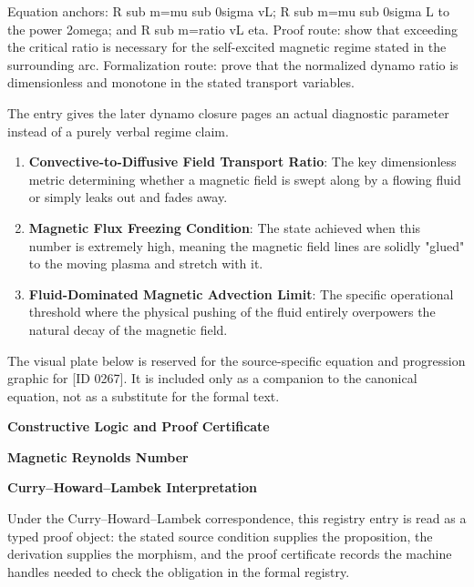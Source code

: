 Equation anchors: R sub m=mu sub 0sigma vL; R sub m=mu sub 0sigma L to the power 2omega; and R sub m=ratio vL eta. Proof route: show that exceeding the critical ratio is necessary for the self-excited magnetic regime stated in the surrounding arc. Formalization route: prove that the normalized dynamo ratio is dimensionless and monotone in the stated transport variables.

The entry gives the later dynamo closure pages an actual diagnostic parameter instead of a purely verbal regime claim.
\endgroup

\begin{enumerate}[leftmargin=1.6em,itemsep=6pt,topsep=4pt]
\item \textbf{Convective-to-Diffusive Field Transport Ratio}: The key dimensionless metric determining whether a magnetic field is swept along by a flowing fluid or simply leaks out and fades away.
\item \textbf{Magnetic Flux Freezing Condition}: The state achieved when this number is extremely high, meaning the magnetic field lines are solidly "glued" to the moving plasma and stretch with it.
\item \textbf{Fluid-Dominated Magnetic Advection Limit}: The specific operational threshold where the physical pushing of the fluid entirely overpowers the natural decay of the magnetic field.
\end{enumerate}

\begingroup\footnotesize\sloppy
The visual plate below is reserved for the source-specific equation and progression graphic for [ID 0267]. It is included only as a companion to the canonical equation, not as a substitute for the formal text.
\par\endgroup
\ifTZPDarkEdition
{}
\fi

\clearpage
\begingroup\tzpsupportsetup
\noindent\textbf{\fontsize{10.8pt}{12.8pt}\selectfont [ID 0267] Constructive Logic and Proof Certificate}\par
\noindent\textbf{\fontsize{10pt}{12pt}\selectfont Magnetic Reynolds Number}\par
\vspace{0.45em}
\begingroup
\footnotesize
\setlength{\parskip}{0.22em}
\setlength{\parindent}{0pt}
\noindent\textbf{Curry--Howard--Lambek Interpretation}\par
Under the Curry--Howard--Lambek correspondence, this registry entry is read as a typed proof
object: the stated source condition supplies the proposition, the derivation supplies the
morphism, and the proof certificate records the machine handles needed to check the obligation
in the formal registry.

